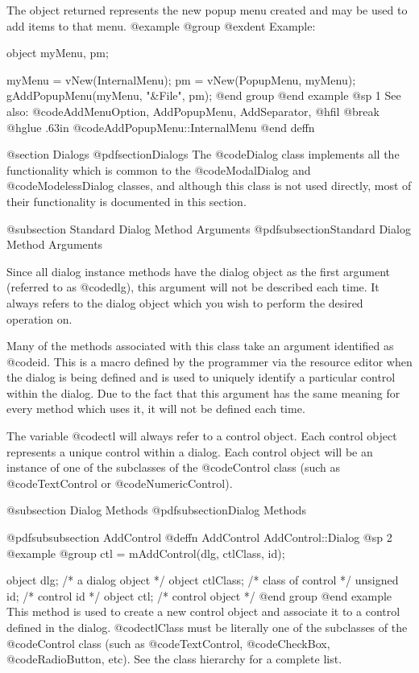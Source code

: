 The object returned represents the new popup menu created and may be
used to add items to that menu.
@example
@group
@exdent Example:

object  myMenu, pm;

myMenu = vNew(InternalMenu);
pm = vNew(PopupMenu, myMenu);
gAddPopupMenu(myMenu, "&File", pm);
@end group
@end example
@sp 1
See also:  @code{AddMenuOption, AddPopupMenu, AddSeparator,}
@hfil @break @hglue .63in     @code{AddPopupMenu::InternalMenu}
@end deffn







@section Dialogs
@pdfsection{Dialogs}
The @code{Dialog} class implements all the functionality which is common
to the @code{ModalDialog} and @code{ModelessDialog} classes, and although
this class is not used directly, most of their functionality is documented
in this section.

@subsection  Standard Dialog Method Arguments
@pdfsubsection{Standard Dialog Method Arguments}

Since all dialog instance methods have the dialog object as the first
argument (referred to as @code{dlg}), this argument will not be described
each time.  It always refers to the dialog object which you wish to
perform the desired operation on.

Many of the methods associated with this class take an argument
identified as @code{id}.  This is a macro defined by the programmer via
the resource editor when the dialog is being defined and is used to
uniquely identify a particular control within the dialog.  Due to the
fact that this argument has the same meaning for every method which
uses it, it will not be defined each time.

The variable @code{ctl} will always refer to a control object.  Each
control object represents a unique control within a dialog.  Each
control object will be an instance of one of the subclasses of the
@code{Control} class (such as @code{TextControl} or
@code{NumericControl}).



@subsection Dialog Methods
@pdfsubsection{Dialog Methods}






@pdfsubsubsection {AddControl}
@deffn {AddControl} AddControl::Dialog
@sp 2
@example
@group
ctl = mAddControl(dlg, ctlClass, id);

object  dlg;       /*  a dialog object   */
object  ctlClass;  /*  class of control  */
unsigned  id;      /*  control id        */
object  ctl;       /*  control object    */
@end group
@end example
This method is used to create a new control object and associate it to
a control defined in the dialog.  @code{ctlClass} must be literally
one of the subclasses of the @code{Control} class (such as
@code{TextControl}, @code{CheckBox}, @code{RadioButton}, etc).
See the class hierarchy for a complete list.

